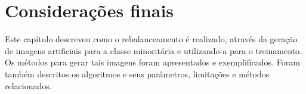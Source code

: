 \section{Considerações finais}

Este capítulo descreveu como o rebalanceamento é realizado, através da geração de imagens artificiais para a classe minoritária e utilizando-a para o treinamento. Os métodos para gerar tais imagens foram apresentados e exemplificados. Foram também descritos os algoritmos e seus parâmetros, limitações e métodos relacionados.


